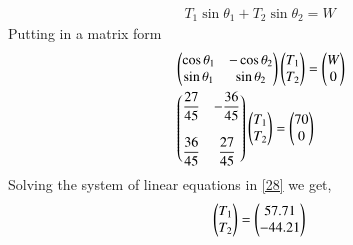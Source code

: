 \documentclass[journal,12pt,twocolumn]{IEEEtran}
\renewcommand\thesection{\arabic{section}}
\begin{document}
\begin{enumerate}[label=\thesection.\arabic*.,ref=\thesection.\theenumi]
\begin{align}
T_1\sin \theta_1 + T_2\sin \theta_2 = W
\end{align}
Putting in a matrix form
\begin{align}
&\begin{pmatrix}\cos \theta_1& - \cos \theta_2\\ \sin \theta_1 & \sin \theta_2  \end{pmatrix}\begin{pmatrix}T_1\\T_2\end{pmatrix} =\begin{pmatrix}W\\0\end{pmatrix}\\
&\begin{pmatrix}\dfrac{27}{45}& - \dfrac{36}{45}\\ \\ \dfrac{36}{45} & \dfrac{27}{45} \end{pmatrix}\begin{pmatrix}T_1\\T_2\end{pmatrix} =\begin{pmatrix}70\\0\end{pmatrix} \label{28}
\end{align}
Solving the  system of linear equations in \eqref{28} we get,
\begin{align}
\begin{pmatrix}T_1\\T_2\end{pmatrix} = \begin{pmatrix}57.71\\-44.21\end{pmatrix}
\end{align}
\end{enumerate}
\end{document}
